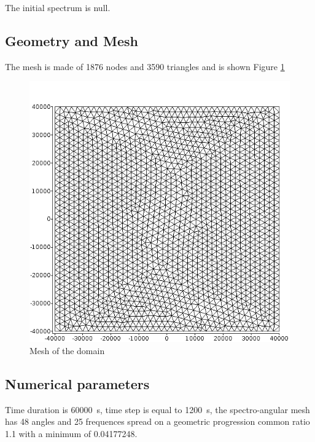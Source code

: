 The initial spectrum is null.
%

%
%
%
%
\subsection{Geometry and Mesh}
%
The mesh is made of 1876 nodes and 3590 triangles and is shown Figure \ref{mail}
\begin{figure} [!h]
\centering
\includegraphics[scale = 0.5]{maill.png}
 \caption{Mesh of the domain}
\label{mail}
\end{figure}

%
%

\subsection{Numerical parameters}
%
Time duration is 60000\ s, time step is equal to 1200\ s, the spectro-angular mesh
has 48 angles and 25 frequences spread on a geometric progression common ratio
1.1 with a minimum of  0.04177248.
%
%
